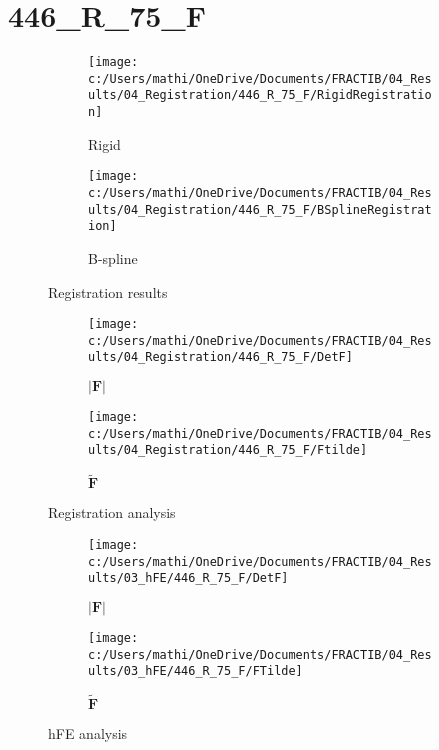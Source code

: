 \documentclass{article}%
\begin{document}
%
\newpage%
\section*{446\_R\_75\_F}%
\label{sec:446R75F}%


\begin{figure}[h!]%
\begin{subfigure}[b]{0.5\linewidth}%
\texttt{[image: c:/Users/mathi/OneDrive/Documents/FRACTIB/04\_Results/04\_Registration/446\_R\_75\_F/RigidRegistration]}%
\caption{Rigid}%
\end{subfigure}%
\begin{subfigure}[b]{0.5\linewidth}%
\texttt{[image: c:/Users/mathi/OneDrive/Documents/FRACTIB/04\_Results/04\_Registration/446\_R\_75\_F/BSplineRegistration]}%
\caption{B{-}spline}%
\end{subfigure}%
\caption{Registration results}%
\end{figure}

%


\begin{figure}[h!]%
\begin{subfigure}[b]{0.5\linewidth}%
\texttt{[image: c:/Users/mathi/OneDrive/Documents/FRACTIB/04\_Results/04\_Registration/446\_R\_75\_F/DetF]}%
\caption{$|\mathbf{F}|$}%
\end{subfigure}%
\begin{subfigure}[b]{0.5\linewidth}%
\texttt{[image: c:/Users/mathi/OneDrive/Documents/FRACTIB/04\_Results/04\_Registration/446\_R\_75\_F/Ftilde]}%
\caption{$\tilde{\mathbf{F}}$}%
\end{subfigure}%
\caption{Registration analysis}%
\end{figure}

%


\begin{figure}[h!]%
\begin{subfigure}[b]{0.5\linewidth}%
\texttt{[image: c:/Users/mathi/OneDrive/Documents/FRACTIB/04\_Results/03\_hFE/446\_R\_75\_F/DetF]}%
\caption{$|\mathbf{F}|$}%
\end{subfigure}%
\begin{subfigure}[b]{0.5\linewidth}%
\texttt{[image: c:/Users/mathi/OneDrive/Documents/FRACTIB/04\_Results/03\_hFE/446\_R\_75\_F/FTilde]}%
\caption{$\tilde{\mathbf{F}}$}%
\end{subfigure}%
\caption{hFE analysis}%
\end{figure}
\end{document}
